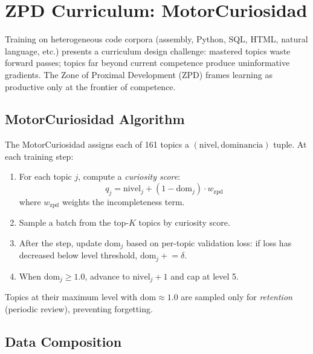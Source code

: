 \documentclass[11pt,a4paper]{article}
\begin{document}
\section{ZPD Curriculum: MotorCuriosidad}
\label{sec:curriculum}

Training on heterogeneous code corpora (assembly, Python, SQL, HTML, natural
language, etc.) presents a curriculum design challenge: mastered topics waste
forward passes; topics far beyond current competence produce uninformative
gradients.  The Zone of Proximal Development (ZPD) \citep{vygotsky1978mind}
frames learning as productive only at the frontier of competence.

\subsection{MotorCuriosidad Algorithm}

The MotorCuriosidad assigns each of 161 topics a
$(\text{nivel}, \text{dominancia})$ tuple.  At each training step:

\begin{enumerate}
    \item For each topic $j$, compute a \emph{curiosity score}:
    \begin{equation}
        q_j = \text{nivel}_j + (1 - \text{dom}_j) \cdot w_\text{zpd}
        \label{eq:curiosity}
    \end{equation}
    where $w_\text{zpd}$ weights the incompleteness term.
    \item Sample a batch from the top-$K$ topics by curiosity score.
    \item After the step, update $\text{dom}_j$ based on per-topic validation
    loss: if loss has decreased below level threshold, $\text{dom}_j \mathrel{+}= \delta$.
    \item When $\text{dom}_j \geq 1.0$, advance to $\text{nivel}_j + 1$ and
    cap at level 5.
\end{enumerate}

Topics at their maximum level with $\text{dom} \approx 1.0$ are sampled only
for \emph{retention} (periodic review), preventing forgetting.

\subsection{Data Composition}
\end{document}
